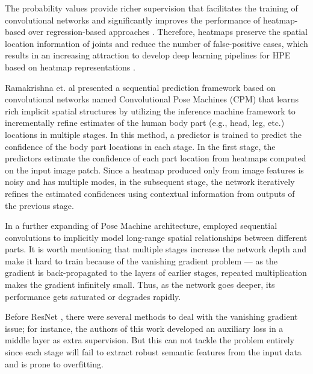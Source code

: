 The probability values provide richer supervision that facilitates the training of convolutional networks and significantly improves the performance of heatmap-based over regression-based approaches \cite{artacho_unipose_2020, bulat_human_2016,gkioxari_chained_2016, lifshitz_human_2016,newell_stacked_2016,tompson_efficient_2015}. Therefore, heatmaps preserve the spatial location information of joints and reduce the number of false-positive cases, which results in an increasing attraction to develop deep learning pipelines for HPE based on heatmap representations \cite{carreira_human_2016,luo_lstm_2018,toshev_deeppose_2014,wei_convolutional_2016}.

Ramakrishna et. al \cite{ramakrishna_pose_2014} presented a sequential prediction framework based on convolutional networks named Convolutional Pose Machines (CPM) that learns rich implicit spatial structures by utilizing the inference machine framework to incrementally refine estimates of the human body part (e.g., head, leg, etc.) locations in multiple stages. In this method, a predictor is trained to predict the confidence of the body part locations in each stage. In the first stage, the predictors estimate the confidence of each part location from heatmaps computed on the input image patch. Since a heatmap produced only from image features is noisy and has multiple modes, in the subsequent stage, the network iteratively refines the estimated confidences using contextual information from outputs of the previous stage. 

In a further expanding of Pose Machine architecture, \cite{wei_convolutional_2016} employed sequential convolutions to implicitly model long-range spatial relationships between different parts. It is worth mentioning that multiple stages increase the network depth and make it hard to train because of the vanishing gradient problem — as the gradient is back-propagated to the layers of earlier stages, repeated multiplication makes the gradient infinitely small. Thus, as the network goes deeper, its performance gets saturated or degrades rapidly. 

Before ResNet \cite{he_deep_2016}, there were several methods to deal with the vanishing gradient issue; for instance, the authors of this work \cite{wei_convolutional_2016} developed an auxiliary loss in a middle layer as extra supervision. But this can not tackle the problem entirely since each stage will fail to extract robust semantic features from the input data and is prone to overfitting.

